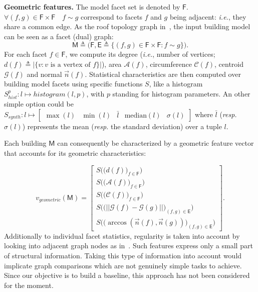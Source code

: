 \documentclass[runningheads]{llncs}
\begin{document}
\noindent
\textbf{Geometric features.}
The model facet set is denoted by $\mathsf{F}$. $\forall (f, g) \in \mathsf{F} \times \mathsf{F} \quad f \sim g$ correspond to facets $f$ and $g$ being adjacent: \textit{i.e.}, they share a common edge. As the roof topology graph in~\cite{Verma2006}, the input building model can be seen as a facet (dual) graph:
\begin{equation}
	\label{eq::model_graph}
	\mathsf{M} \triangleq \Big(\mathsf{F}, \mathsf{E} \triangleq \big\{ (f, g) \in \mathsf{F} \times \mathsf{F} : f \sim g \big\} \Big).
\end{equation}
For each facet $f \in \mathsf{F}$, we compute its degree (\textit{i.e.}, number of vertices; $d(f) \triangleq \vert\{v : v\text{ is a vertex of }f\}\vert$), area $\mathscr{A}(f)$, circumference $\mathscr{C}(f)$, centroid $\mathscr{G}(f)$ and  normal $\vec{n}(f)$. Statistical characteristics are then computed over building model facets using specific functions $S$, like a histogram $S^p_{hist}: l \mapsto histogram(l, p)$, with $p$ standing for histogram parameters. An other simple option could be $S_{synth}: l \mapsto \begin{bmatrix}
\max(l)& \min(l) & \bar{l} & \text{median}(l) & \sigma(l)
\end{bmatrix}$ where $\bar{l}$ (\textit{resp.} $\sigma(l)$) represents the mean (\textit{resp.} the standard deviation) over a tuple $l$.

Each building $\mathsf{M}$ can consequently be characterized by a geometric feature vector that accounts for its geometric characteristics:

\begin{equation}
	\label{eq::geom_feat}
    v_{geometric}(\mathsf{M}) = \begin{bmatrix}
    	S \Big(\big(d(f)\big)_{f \in \mathsf{F}}\Big)\\
    	S \Big(\big(\mathscr{A}(f)\big)_{f \in \mathsf{F}}\Big)\\
    	S \Big(\big(\mathscr{C}(f)\big)_{f \in \mathsf{F}}\Big)\\
    	S \Big(\big( \vert\vert \mathscr{G}(f) - \mathscr{G}(g) \vert\vert \big)_{(f,g) \in \mathsf{E}}\Big)\\
    	S\Big(\big( \arccos(\vec{n}(f), \vec{n}(g)) \big)_{(f,g) \in \mathsf{E}}\Big)
    \end{bmatrix}.
\end{equation}
Additionally to individual facet statistics, regularity is taken into account by looking into adjacent graph nodes as in~\cite{Zhou2012}. Such features express only a small part of structural information. Taking this type of information into account would implicate graph comparisons which are not genuinely simple tasks to achieve. Since our objective is to build a baseline, this approach has not been considered for the moment.
\end{document}
